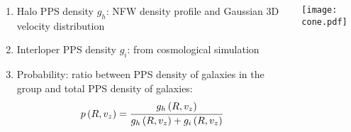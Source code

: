 
\begin{frame}
    \begin{columns}
        \begin{column}{0.6\textwidth}
            \begin{block}{}
                \begin{enumerate}
                    \item<1-> Halo PPS density $g_h$: NFW density profile and
                        Gaussian 3D velocity distribution
                    \item<2-> Interloper PPS density $g_i$: from cosmological
                        simulation
                    \item<3-> Probability: ratio between PPS density of
                        galaxies in the group and total PPS density of
                        galaxies:
                        \begin{equation}
                            p\left(R, v_z\right) = \cfrac{%
                                g_h\left(R, v_z\right)
                            }{g_h\left(R, v_z\right) + g_i\left(R, v_z\right)}
                            \nonumber
                        \end{equation}
                \end{enumerate}
            \end{block}
        \end{column}
        \begin{column}{0.5\textwidth}
            \centering
            \texttt{[image: cone.pdf]}\hfill
        \end{column}
    \end{columns}
\end{frame}

